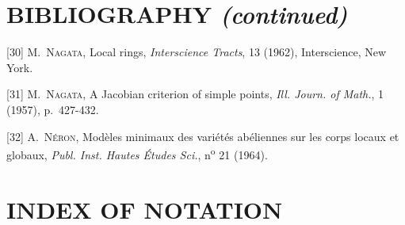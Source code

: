 \section*{BIBLIOGRAPHY \textit{(continued)}}

\begingroup
\small
\setlength{\parindent}{0pt}
\setlength{\parskip}{3pt}
[30] M.~\textsc{Nagata}, Local rings, \emph{Interscience Tracts}, 13 (1962),
Interscience, New York.

[31] M.~\textsc{Nagata}, A Jacobian criterion of simple points,
\emph{Ill. Journ. of Math.}, 1 (1957), p.~427-432.

[32] A.~\textsc{Néron}, Modèles minimaux des variétés abéliennes sur les corps
locaux et globaux, \emph{Publ. Inst. Hautes Études Sci.}, n\textsuperscript{o}
21 (1964).

\clearpage
{}
{}

\section*{INDEX OF NOTATION}

